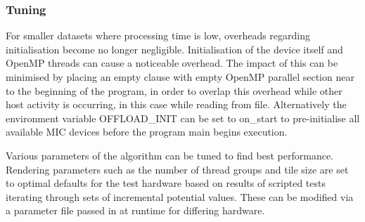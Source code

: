 \documentclass[runningheads,a4paper]{llncs}
\begin{document}
\subsubsection{Tuning}
\label{sect:tuning}

For smaller datasets where processing time is low, overheads regarding initialisation become no longer negligible. 
Initialisation of the device itself and OpenMP threads can cause a noticeable overhead. The impact of this can be 
minimised by placing an empty clause with empty OpenMP parallel section near to the beginning of the program, in order 
to overlap this overhead while other host activity is occurring, in this case while reading from file. Alternatively the 
environment variable OFFLOAD\_INIT can be set to on\_start to pre-initialise all available MIC devices before the program 
main begins execution. 


Various parameters of the algorithm can be tuned to find best performance. Rendering parameters such as the number of 
thread groups and tile size are set to optimal defaults for the test hardware based on results of scripted tests iterating 
through sets of incremental potential values. These can be modified via a parameter file passed in at runtime for differing 
hardware.

\end{document}
